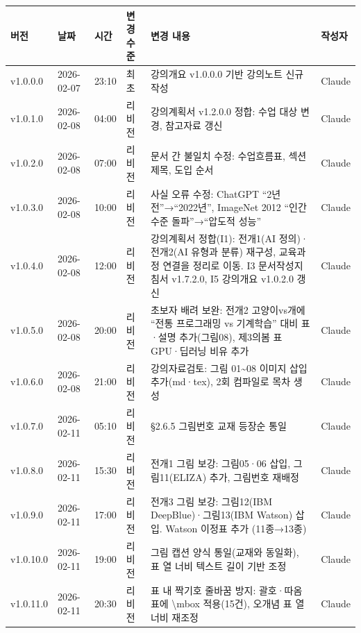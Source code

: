 \documentclass[11pt,a4paper]{article}
\begin{document}
\begin{center}
\begin{tabular}{|l|l|l|l|p{4.5cm}|l|}
\hline
\rowcolor{tableheader}
\textbf{버전} & \textbf{날짜} & \textbf{시간} & \textbf{변경 수준} & \textbf{변경 내용} & \textbf{작성자} \\
\hline
v1.0.0.0 & 2026-02-07 & 23:10 & 최초 & 강의개요 v1.0.0.0 기반 강의노트 신규 작성 & Claude \\
\hline
v1.0.1.0 & 2026-02-08 & 04:00 & 리비전 & 강의계획서 v1.2.0.0 정합: 수업 대상 변경, 참고자료 갱신 & Claude \\
\hline
v1.0.2.0 & 2026-02-08 & 07:00 & 리비전 & 문서 간 불일치 수정: 수업흐름표, 섹션 제목, 도입 순서 & Claude \\
\hline
v1.0.3.0 & 2026-02-08 & 10:00 & 리비전 & 사실 오류 수정: ChatGPT ``2년 전''→``2022년'', ImageNet 2012 ``인간 수준 돌파''→``압도적 성능'' & Claude \\
\hline
v1.0.4.0 & 2026-02-08 & 12:00 & 리비전 & 강의계획서 정합(I1): 전개1(AI 정의)·전개2(AI 유형과 분류) 재구성, 교육과정 연결을 정리로 이동. I3 문서작성지침서 v1.7.2.0, I5 강의개요 v1.0.2.0 갱신 & Claude \\
\hline
v1.0.5.0 & 2026-02-08 & 20:00 & 리비전 & 초보자 배려 보완: 전개2 고양이vs개에 ``전통 프로그래밍 vs 기계학습'' 대비 표·설명 추가(그림08), 제3의봄 표 GPU·딥러닝 비유 추가 & Claude \\
\hline
v1.0.6.0 & 2026-02-08 & 21:00 & 리비전 & 강의자료검토: 그림 01\textasciitilde 08 이미지 삽입 추가(md·tex), 2회 컴파일로 목차 생성 & Claude \\
v1.0.7.0 & 2026-02-11 & 05:10 & 리비전 & §2.6.5 그림번호 교재 등장순 통일 & Claude \\
\hline
v1.0.8.0 & 2026-02-11 & 15:30 & 리비전 & 전개1 그림 보강: 그림05·06 삽입, 그림11(ELIZA) 추가, 그림번호 재배정 & Claude \\
\hline
v1.0.9.0 & 2026-02-11 & 17:00 & 리비전 & 전개3 그림 보강: 그림12(IBM DeepBlue)·그림13(IBM Watson) 삽입. Watson 이정표 추가 (11종→13종) & Claude \\
\hline
v1.0.10.0 & 2026-02-11 & 19:00 & 리비전 & 그림 캡션 양식 통일(교재와 동일화), 표 열 너비 텍스트 길이 기반 조정 & Claude \\
\hline
v1.0.11.0 & 2026-02-11 & 20:30 & 리비전 & 표 내 짝기호 줄바꿈 방지: 괄호·따옴표에 \textbackslash mbox 적용(15건), 오개념 표 열 너비 재조정 & Claude \\
\hline
\end{tabular}
\end{center}
\end{document}
